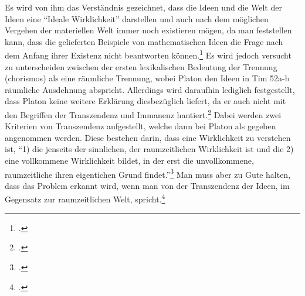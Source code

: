 
Es wird von ihm das Verständnis gezeichnet, dass die Ideen und die Welt der Ideen eine \enquote{Ideale Wirklichkeit} darstellen und auch nach dem möglichen Vergehen der materiellen Welt immer noch existieren mögen, da man feststellen kann, dass die gelieferten Beispiele von mathematischen Ideen die Frage nach dem Anfang ihrer Existenz nicht beantworten können.\footcite[vgl.][S. 99]{Hirschberger} 
Es wird jedoch versucht zu unterscheiden zwischen der ersten lexikalischen Bedeutung der Trennung (chorismos) als eine räumliche Trennung, wobei Platon den Ideen in Tim 52a-b räumliche Ausdehnung abspricht. Allerdings wird daraufhin lediglich festgestellt, dass Platon keine weitere Erklärung diesbezüglich liefert, da er auch nicht mit den Begriffen der Transzendenz und Immanenz hantiert.\footcite[vgl.][S. 34f]{DisseMetaphysik} Dabei werden zwei Kriterien von Transzendenz aufgestellt, welche dann bei Platon als gegeben angenommen werden. Diese bestehen darin, dass eine Wirklichkeit zu verstehen ist, \enquote{1) die jenseits der sinnlichen, der raumzeitlichen Wirklichkeit ist und die 2) eine vollkommene Wirklichkeit bildet, in der erst die unvollkommene, raumzeitliche ihren eigentichen Grund findet.}\footcite[][S. 35]{DisseMetaphysik} Man muss aber zu Gute halten, dass das Problem erkannt wird, wenn man von der Transzendenz der Ideen, im Gegensatz zur raumzeitlichen Welt, spricht.\footcite[vgl.][S. 35]{DisseMetaphysik} 
